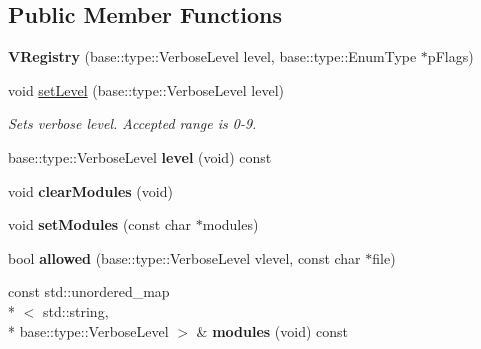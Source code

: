 \subsection*{Public Member Functions}
\begin{DoxyCompactItemize}
\item 
\hypertarget{classel_1_1base_1_1VRegistry_ac4b36d32d3722238024480ce66c52ad0}{{\bfseries V\-Registry} (base\-::type\-::\-Verbose\-Level level, base\-::type\-::\-Enum\-Type $\ast$p\-Flags)}\label{classel_1_1base_1_1VRegistry_ac4b36d32d3722238024480ce66c52ad0}

\item 
\hypertarget{classel_1_1base_1_1VRegistry_aea4fb84a03363080ee2501193084f71f}{void \hyperlink{classel_1_1base_1_1VRegistry_aea4fb84a03363080ee2501193084f71f}{set\-Level} (base\-::type\-::\-Verbose\-Level level)}\label{classel_1_1base_1_1VRegistry_aea4fb84a03363080ee2501193084f71f}

\begin{DoxyCompactList}\small\item\em Sets verbose level. Accepted range is 0-\/9. \end{DoxyCompactList}\item 
\hypertarget{classel_1_1base_1_1VRegistry_ad68e225738ecde9a5a59e9fcdfdcc1b9}{base\-::type\-::\-Verbose\-Level {\bfseries level} (void) const }\label{classel_1_1base_1_1VRegistry_ad68e225738ecde9a5a59e9fcdfdcc1b9}

\item 
\hypertarget{classel_1_1base_1_1VRegistry_a52de90db82e57827ac3d3994f70c17cf}{void {\bfseries clear\-Modules} (void)}\label{classel_1_1base_1_1VRegistry_a52de90db82e57827ac3d3994f70c17cf}

\item 
\hypertarget{classel_1_1base_1_1VRegistry_a65e202cc547cd11231d3ea0fb70765d0}{void {\bfseries set\-Modules} (const char $\ast$modules)}\label{classel_1_1base_1_1VRegistry_a65e202cc547cd11231d3ea0fb70765d0}

\item 
\hypertarget{classel_1_1base_1_1VRegistry_a13b725e3da8935fce5cf3c16fd3a2ff9}{bool {\bfseries allowed} (base\-::type\-::\-Verbose\-Level vlevel, const char $\ast$file)}\label{classel_1_1base_1_1VRegistry_a13b725e3da8935fce5cf3c16fd3a2ff9}

\item 
\hypertarget{classel_1_1base_1_1VRegistry_a088456766019a17f5e3fb53ae41abcce}{const std\-::unordered\-\_\-map\\*
$<$ std\-::string, \\*
base\-::type\-::\-Verbose\-Level $>$ \& {\bfseries modules} (void) const }\label{classel_1_1base_1_1VRegistry_a088456766019a17f5e3fb53ae41abcce}


\end{DoxyCompactItemize}
